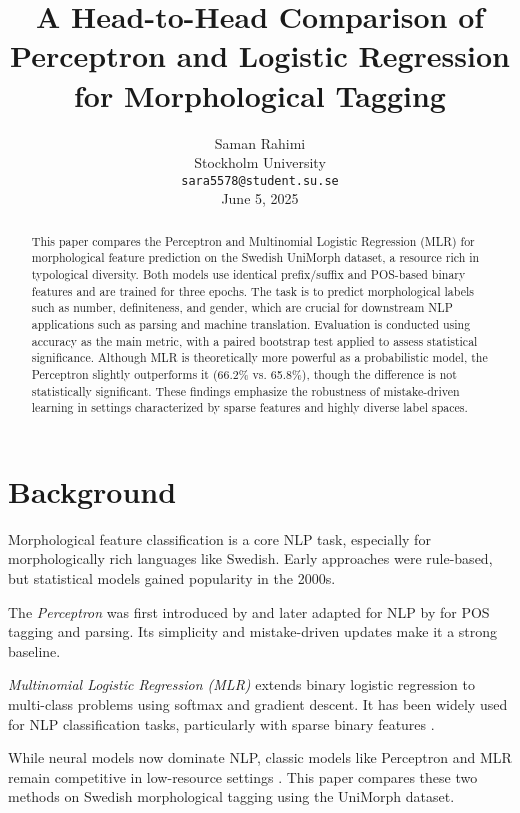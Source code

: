\documentclass[11pt]{article}
\title{A Head-to-Head Comparison of Perceptron and Logistic Regression for Morphological Tagging}
\author{
  Saman Rahimi \\
  Stockholm University \\
  \texttt{sara5578@student.su.se} \\
  \textnormal{June 5, 2025}
}
\begin{document}
\maketitle

\begin{abstract}
This paper compares the Perceptron and Multinomial Logistic Regression (MLR) for morphological feature prediction on the Swedish UniMorph dataset, a resource rich in typological diversity. Both models use identical prefix/suffix and POS-based binary features and are trained for three epochs. The task is to predict morphological labels such as number, definiteness, and gender, which are crucial for downstream NLP applications such as parsing and machine translation. Evaluation is conducted using accuracy as the main metric, with a paired bootstrap test applied to assess statistical significance. Although MLR is theoretically more powerful as a probabilistic model, the Perceptron slightly outperforms it (66.2\% vs. 65.8\%), though the difference is not statistically significant. These findings emphasize the robustness of mistake-driven learning in settings characterized by sparse features and highly diverse label spaces.
\end{abstract}

\section{Background}

Morphological feature classification is a core NLP task, especially for morphologically rich languages like Swedish. Early approaches were rule-based, but statistical models gained popularity in the 2000s.

The \textit{Perceptron} was first introduced by \citet{rosenblatt1958perceptron} and later adapted for NLP by \citet{collins2002perceptron} for POS tagging and parsing. Its simplicity and mistake-driven updates make it a strong baseline.

\textit{Multinomial Logistic Regression (MLR)} extends binary logistic regression to multi-class problems using softmax and gradient descent. It has been widely used for NLP classification tasks, particularly with sparse binary features \citep{jurafsky2024slp3}.

While neural models now dominate NLP, classic models like Perceptron and MLR remain competitive in low-resource settings \citep{cotterell2018unimorph}. This paper compares these two methods on Swedish morphological tagging using the UniMorph dataset.
\end{document}
